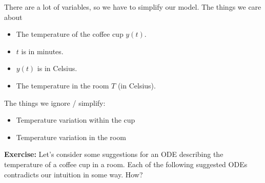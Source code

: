\begin{itemize}
\begin{example}
              There are a lot of variables, so we have to simplify our model. The things we care about
              \begin{itemize}
                  \item The temperature of the coffee cup $y(t)$.
                  \item $t$ is in minutes.
                  \item $y(t)$ is in Celsius.
                  \item The temperature in the room $T$ (in Celsius).
              \end{itemize}
              The things we ignore / simplify:
              \begin{itemize}
                  \item Temperature variation within the cup
                  \item Temperature variation in the room
              \end{itemize}
              \textbf{Exercise:} Let's consider some suggestions for an ODE describing the temperature of a coffee cup in a room. Each of the following suggested ODEs contradicts our intuition in some way. How?


\end{example}
\end{itemize}
